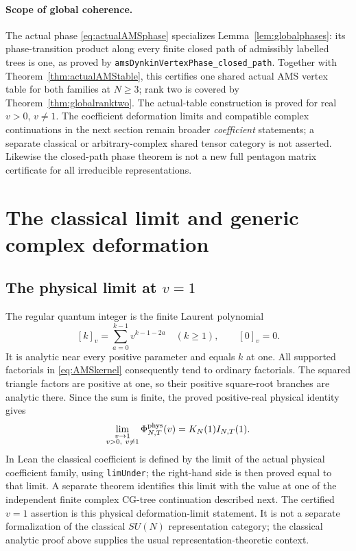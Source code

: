\documentclass[10pt,a4paper]{article}
\newcommand{\lean}[1]{{\small\nolinkurl{#1}}}
\newenvironment{revision}{\begingroup}{\endgroup}
\begin{document}
\begin{revision}
\paragraph{Scope of global coherence.}
The actual phase \eqref{eq:actualAMSphase} specializes
Lemma~\ref{lem:globalphases}: its phase-transition product along every
finite closed path of admissibly labelled trees is one, as proved by
\lean{amsDynkinVertexPhase_closed_path}. Together with
Theorem~\ref{thm:actualAMStable}, this certifies one shared actual AMS
vertex table for both families at $N\ge3$; rank two is covered by
Theorem~\ref{thm:globalranktwo}. The actual-table construction is proved
for real $v>0$, $v\ne1$. The coefficient deformation limits and
compatible complex continuations in the next section remain broader
\emph{coefficient} statements; a separate classical or arbitrary-complex
shared tensor category is not asserted. Likewise the closed-path
phase theorem is not a new full pentagon matrix certificate for all
irreducible representations.

\section{The classical limit and generic complex deformation}\label{sec:continuation}
\subsection{The physical limit at \texorpdfstring{$v=1$}{v=1}}
The regular quantum integer is the finite Laurent polynomial
\[
 [k]_v=\sum_{a=0}^{k-1}v^{k-1-2a}\quad(k\ge1),
 \qquad [0]_v=0.
\]
It is analytic near every positive parameter and equals $k$ at one.
All supported factorials in \eqref{eq:AMSkernel} consequently tend to
ordinary factorials. The squared triangle factors are positive at one,
so their positive square-root branches are analytic there. Since the sum
is finite, the proved positive-real physical identity gives
\begin{equation}\label{eq:certclassical}
 \lim_{\substack{v\to1\\v>0,\ v\ne1}}\Phi^{\rm phys}_{N,T}(v)
       =K_N(1)I_{N,T}(1).
\end{equation}
In Lean the classical coefficient is defined by the limit of the actual
physical coefficient family, using \lean{limUnder}; the right-hand side
is then proved equal to that limit. A separate theorem identifies this
limit with the value at one of the independent finite complex CG-tree
continuation described next. The certified $v=1$ assertion is this physical
deformation-limit statement. It is not a separate formalization of the
classical $SU(N)$ representation category; the classical analytic proof
above supplies the usual representation-theoretic context.


\end{revision}
\end{document}
